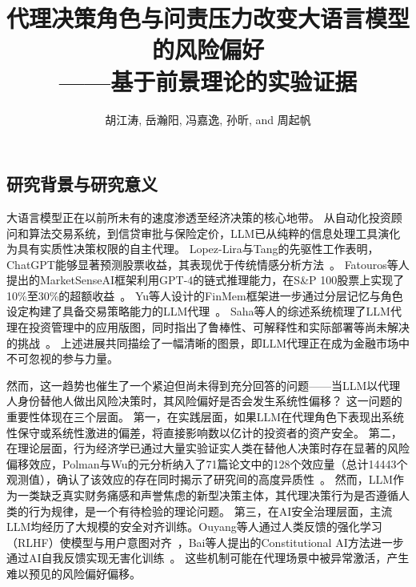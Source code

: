 \documentclass[journal]{vgtc}
\title{代理决策角色与问责压力改变大语言模型的风险偏好\\
——基于前景理论的实验证据}
\author{%
  胡江涛,
  岳瀚阳,
  冯嘉逸,
  孙昕, and
  周起帆
}
\begin{document}
\makeatletter
\renewcommand{\ps@plain}{%
  \renewcommand{\@oddhead}{}%
  \renewcommand{\@oddfoot}{\hfil\textrm{\thepage}\hfil}%
  \renewcommand{\@evenhead}{}%
  \renewcommand{\@evenfoot}{\hfil\textrm{\thepage}\hfil}%
}
\makeatother
\pagestyle{plain}

\maketitle
\subsection{研究背景与研究意义}

大语言模型正在以前所未有的速度渗透至经济决策的核心地带。
从自动化投资顾问和算法交易系统，到信贷审批与保险定价，LLM已从纯粹的信息处理工具演化为具有实质性决策权限的自主代理。
Lopez-Lira与Tang的先驱性工作表明，ChatGPT能够显著预测股票收益，其表现优于传统情感分析方法~\cite{LopezLira2023Can}。
Fatouros等人提出的MarketSenseAI框架利用GPT-4的链式推理能力，在S\&P 100股票上实现了10\%至30\%的超额收益~\cite{Fatouros2024Can}。
Yu等人设计的FinMem框架进一步通过分层记忆与角色设定构建了具备交易策略能力的LLM代理~\cite{Yu2023FinMem}。
Saha等人的综述系统梳理了LLM代理在投资管理中的应用版图，同时指出了鲁棒性、可解释性和实际部署等尚未解决的挑战~\cite{Saha2025Large}。
上述进展共同描绘了一幅清晰的图景，即LLM代理正在成为金融市场中不可忽视的参与力量。

然而，这一趋势也催生了一个紧迫但尚未得到充分回答的问题——当LLM以代理人身份替他人做出风险决策时，其风险偏好是否会发生系统性偏移？
这一问题的重要性体现在三个层面。
第一，在实践层面，如果LLM在代理角色下表现出系统性保守或系统性激进的偏差，将直接影响数以亿计的投资者的资产安全。
第二，在理论层面，行为经济学已通过大量实验证实人类在替他人决策时存在显著的风险偏移效应，Polman与Wu的元分析纳入了71篇论文中的128个效应量（总计14443个观测值），确认了该效应的存在同时揭示了研究间的高度异质性~\cite{Polman2020Decision}。
然而，LLM作为一类缺乏真实财务痛感和声誉焦虑的新型决策主体，其代理决策行为是否遵循人类的行为规律，是一个有待检验的理论问题。
第三，在AI安全治理层面，主流LLM均经历了大规模的安全对齐训练。Ouyang等人通过人类反馈的强化学习（RLHF）使模型与用户意图对齐~\cite{Ouyang2022Training}，Bai等人提出的Constitutional AI方法进一步通过AI自我反馈实现无害化训练~\cite{Bai2022Constitutional}。
这些机制可能在代理场景中被异常激活，产生难以预见的风险偏好偏移。
\end{document}
